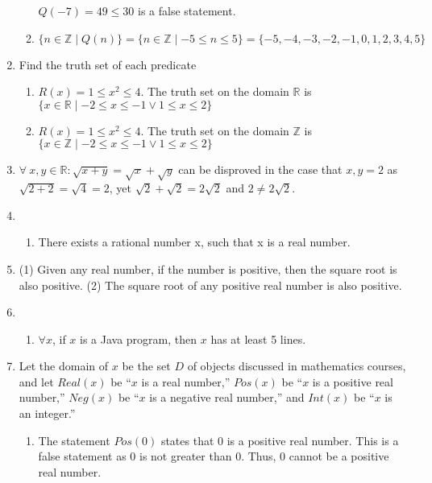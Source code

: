 \documentclass{article}
\makeatletter
\newcommand\setItemnumber[1]{\setcounter{enum\romannumeral\@enumdepth}{\numexpr#1-1\relax}}
\makeatother
\begin{document}
\begin{enumerate}
\begin{enumerate}
         $Q(-7) = 49\leq 30$ is a false statement.
         \item $\{n \in \mathbb{Z} \mid Q(n)\} = \{n \in \mathbb{Z} \mid -5 \leq n \leq 5\} = \{-5, -4, -3, -2, -1, 0, 1, 2, 3, 4, 5\}$
     \end{enumerate}
     \setItemnumber{7}
     \item Find the truth set of each predicate
     \begin{enumerate}
         \setItemnumber{3}
         \item $R(x) = 1\leq x^2\leq4.$ The truth set on the domain $\mathbb{R}$ is $\{x\in\mathbb{R}\mid -2 \leq x \leq -1 \lor 1 \leq x \leq 2\} $
         \item $R(x) = 1\leq x^2\leq4.$ The truth set on the domain $\mathbb{Z}$ is $\{x\in\mathbb{Z}\mid -2 \leq x \leq -1 \lor 1 \leq x \leq 2\} $
     \end{enumerate}
     \setItemnumber{12}
     \item $\forall\:x, y \in \mathbb{R}:  \sqrt{x+y} = \sqrt{x}+\sqrt{y}$ can be disproved in the case that $x,y = 2$ as $\sqrt{2+2} = \sqrt{4} = 2$, yet
     $\sqrt{2} + \sqrt{2} = 2\sqrt{2}$ and $2 \neq 2\sqrt{2}$.
     \setItemnumber{17}
     \item 
     \begin{enumerate}
         \setItemnumber{2}
         \item There exists a rational number x, such that x is a real number.
     \end{enumerate}
     \setItemnumber{20}
     \item (1) Given any real number, if the number is positive, then the square root is also positive. (2) The square root of any positive real number is also positive.
     \setItemnumber{22}
     \item 
     \begin{enumerate}
         \item $\forall x$, if $x$ is a Java program, then $x$ has at least 5 lines.
     \end{enumerate}
     \setItemnumber{28}
     \item Let the domain of $x$ be the set $D$ of objects discussed in mathematics courses, and let $Real(x)$ be ``$x$ is a real number,” $Pos(x)$ be ``$x$ is a positive real number,” $Neg(x)$ be ``$x$ is a negative real number,” and $Int(x)$ be ``$x$ is an integer.”
     \begin{enumerate}
         \item The statement $Pos(0)$ states that 0 is a positive real number. This is a false statement as 0 is not greater than 0. Thus, 0 cannot be a positive real number.

\end{enumerate}
\end{enumerate}
\end{document}
